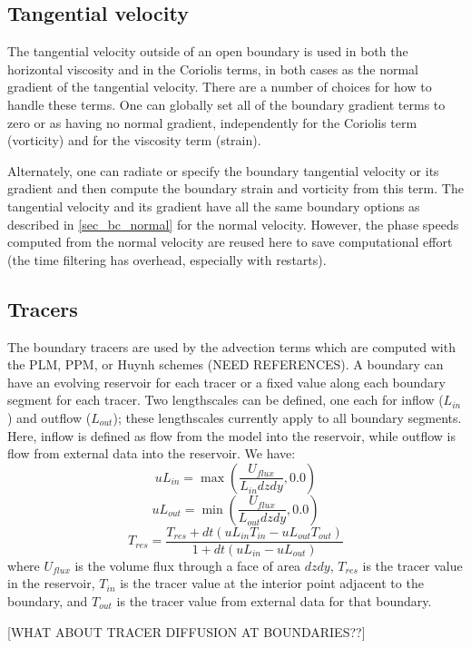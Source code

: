 \documentclass[11pt]{article}
\begin{document}
\subsection{Tangential velocity}
The tangential velocity outside of an open boundary is used in both
the horizontal viscosity and in the Coriolis terms, in both cases as
the normal gradient of the tangential velocity. There are a number of
choices for how to handle these terms. One can globally set all of
the boundary gradient terms to zero or as having no normal gradient,
independently for the Coriolis term (vorticity) and for the viscosity
term (strain).

Alternately, one can radiate or specify the boundary tangential
velocity or its gradient and then compute the boundary strain and
vorticity from this term.  The tangential velocity and its
gradient have all the same boundary options as described in
\ref{sec_bc_normal} for the normal velocity. However, the phase
speeds computed from the normal velocity are reused here to save
computational effort (the time filtering has overhead, especially
with restarts).

\subsection{Tracers}
The boundary tracers are used by the advection terms which are
computed with the PLM, PPM, or Huynh schemes (NEED REFERENCES). A
boundary can have an evolving reservoir for each tracer or a fixed
value along each boundary segment for each tracer. Two lengthscales
can be defined, one each for inflow ($L_{in}$) and outflow ($L_{out}$);
these lengthscales currently apply to all boundary segments. Here,
inflow is defined as flow from the model into the reservoir, while
outflow is flow from external data into the reservoir. We have:
$$
  u L_{in} = \max(\frac{U_{flux} }{L_{in} dz dy}, 0.0)
$$
$$
  u L_{out} = \min(\frac{U_{flux} }{L_{out} dz dy}, 0.0)
$$
\begin{equation}
  T_{res} = \frac{ T_{res} + dt (u L_{in} T_{in} - u L_{out} T_{out})}
  {1 + dt (u L_{in} - u L_{out})}
\end{equation}
where $U_{flux}$ is the volume flux through a face of area $dz dy$,
$T_{res}$ is the tracer value in the reservoir, $T_{in}$ is the
tracer value at the interior point adjacent to the boundary, and
$T_{out}$ is the tracer value from external data for that boundary.

[WHAT ABOUT TRACER DIFFUSION AT BOUNDARIES??]
\end{document}

